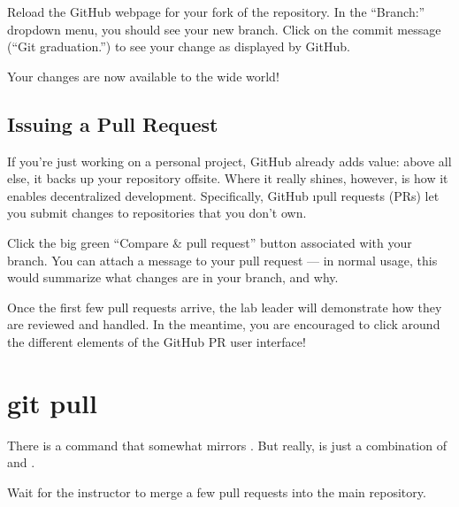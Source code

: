 \documentclass[letterpaper, 12pt, titlepage, twoside]{article}
\begin{document}
\begin{noncli}
  Reload the GitHub webpage for your fork of the  repository. In
  the ``Branch:'' dropdown menu, you should see your new 
  branch. Click on the commit message (``Git graduation.'') to see your change
  as displayed by GitHub.
\end{noncli}

Your changes are now available to the wide world!

\subsection*{Issuing a Pull Request}


If you're just working on a personal project, GitHub already adds value: above
all else, it backs up your repository offsite. Where it really shines,
however, is how it enables decentralized development. Specifically, GitHub
\i{pull requests} (PRs) \x let you submit changes to repositories that you
don't own.

\begin{noncli}
  Click the big green ``Compare \& pull request'' button associated with your
   branch. You can attach a message to your pull request --- in
  normal usage, this would summarize what changes are in your branch, and why.

  Once the first few pull requests arrive, the lab leader will demonstrate how
  they are reviewed and handled. In the meantime, you are encouraged to click
  around the different elements of the GitHub PR user interface!
\end{noncli}


\section{git pull}

There is a  command that somewhat mirrors . But really,
 is just a combination of  and .

\begin{noncli}
  Wait for the instructor to merge a few pull requests into the main
  repository.
\end{noncli}

\end{document}
